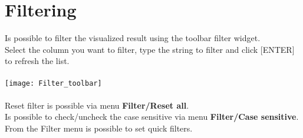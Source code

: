 \chapter{Filtering}

Is possible to filter the visualized result using the toolbar filter widget.\\
Select the column you want to filter, type the string to filter and click [ENTER] to refresh the list.
\\\\
\texttt{[image: Filter\_toolbar]}
\\\\
Reset filter is possible via menu \textbf{Filter/Reset all}.\\
Is possible to check/uncheck the case sensitive via menu \textbf{Filter/Case sensitive}.\\
From the Filter menu is possible to set quick filters.

\clearpage